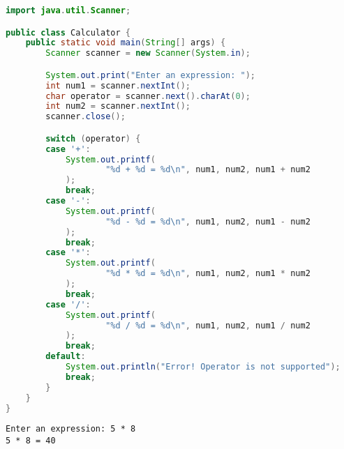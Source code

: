 
\begin{lstlisting}[language=Java]
import java.util.Scanner;

public class Calculator {
	public static void main(String[] args) {
		Scanner scanner = new Scanner(System.in);

		System.out.print("Enter an expression: ");
		int num1 = scanner.nextInt();
		char operator = scanner.next().charAt(0);
		int num2 = scanner.nextInt();
		scanner.close();

		switch (operator) {
		case '+':
			System.out.printf(
					"%d + %d = %d\n", num1, num2, num1 + num2
			);
			break;
		case '-':
			System.out.printf(
					"%d - %d = %d\n", num1, num2, num1 - num2
			);
			break;
		case '*':
			System.out.printf(
					"%d * %d = %d\n", num1, num2, num1 * num2
			);
			break;
		case '/':
			System.out.printf(
					"%d / %d = %d\n", num1, num2, num1 / num2
			);
			break;
		default:
			System.out.println("Error! Operator is not supported");
			break;
		}
	}
}
\end{lstlisting}

\begin{tcolorbox}
	\begin{verbatim}
Enter an expression: 5 * 8
5 * 8 = 40
\end{verbatim}
\end{tcolorbox}

\newpage